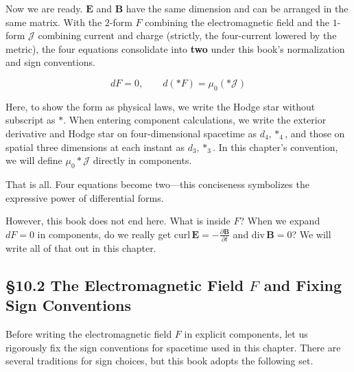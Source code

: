 \documentclass[a4paper,12pt,openany]{book}
\begin{document}
Now we are ready. \(\mathbf{E}\) and \(\mathbf{B}\) have the same
dimension and can be arranged in the same matrix. With the \(2\)-form
\(F\) combining the electromagnetic field and the \(1\)-form
\(\mathcal{J}\) combining current and charge (strictly, the four-current
lowered by the metric), the four equations consolidate into \textbf{two}
under this book's normalization and sign conventions.

\[dF = 0, \qquad d(\ast F) = \mu_0(\ast\mathcal{J})\]

Here, to show the form as physical laws, we write the Hodge star without
subscript as \(\ast\). When entering component calculations, we write
the exterior derivative and Hodge star on four-dimensional spacetime as
\(d_4,\ast_4\), and those on spatial three dimensions at each instant as
\(d_3,\ast_3\). In this chapter's convention, we will define
\(\mu_0\ast\mathcal{J}\) directly in components.

That is all. Four equations become two—this conciseness symbolizes the
expressive power of differential forms.

However, this book does not end here. What is inside \(F\)? When we
expand \(dF=0\) in components, do we really get
\(\mathrm{curl}\,\mathbf{E} = -\frac{\partial\mathbf{B}}{\partial t}\)
and \(\mathrm{div}\,\mathbf{B} = 0\)? We will write all of that out in
this chapter.

\par\vspace{0.35em}\par

\hypertarget{the-electromagnetic-field-f-and-fixing-sign-conventions}{%
\subsection{\texorpdfstring{§10.2 The Electromagnetic Field \(F\) and
Fixing Sign
Conventions}{§10.2 The Electromagnetic Field F and Fixing Sign Conventions}}\label{the-electromagnetic-field-f-and-fixing-sign-conventions}}

Before writing the electromagnetic field \(F\) in explicit components,
let us rigorously fix the sign conventions for spacetime used in this
chapter. There are several traditions for sign choices, but this book
adopts the following set.
\end{document}
